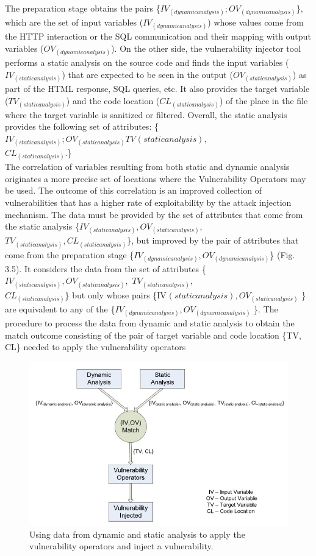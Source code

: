 \newline
The preparation stage obtains  the pairs \{$ IV_{(dynamic analysis)}; OV_{(dynamic analysis)} $\}, which are the set of
input variables ($ IV_{(dynamic analysis)} $) whose values come from
the HTTP interaction or the SQL communication and their
mapping with output variables ($ OV_{(dynamic analysis)} $). On the other side, the vulnerability injector tool performs a static analysis on the source code and finds the input variables ($ IV_{(static analysis)} $) that are expected to be seen in the
output ($ OV_{(static analysis)} $) as part of the HTML response,
SQL queries, etc. It also provides the target variable
($ TV_{(static analysis)} $) and the code location ($ CL_{(static analysis)} $)
of the place in the file where the target variable is sanitized
or filtered. Overall, the static analysis provides the following set of attributes: \{$ IV_{(static analysis)}; OV_{(static analysis)} TV_{}(static analysis),$ \\$ CL_{(static analysis)}. $\}
\\
\newline
The correlation of variables resulting from both static
and dynamic analysis originates a more precise set of locations where the Vulnerability Operators may be used. The
outcome of this correlation is an improved collection of
vulnerabilities that has a higher rate of exploitability by
the attack injection mechanism. The data must be provided
by the set of attributes that come from the static analysis
\{$ IV_{(static analysis)}, OV_{(static analysis)},$ \\ $ TV_{(static analysis)},
	CL_{(static analysis)} $\}, but improved by the pair of attributes
that come from the preparation stage \{$ IV_{(dynamic analysis)},
	OV_{(dynamic analysis)} $\} (Fig. 3.5). It considers the data from
the set of attributes \{$ IV_{(static analysis)}, OV_{(static analysis)},$
$TV_{(static analysis)}, $ \\ $CL_{(static analysis)} $\} but only whose pairs
\{IV$ _{}(static analysis), OV_{(static analysis)} $ \} are equivalent to any of
the \{$ IV_{(dynamic analysis)}, OV_{(dynamic analysis)} $ \}. The procedure to
process the data from dynamic and static analysis to obtain
the match outcome consisting of the pair of target variable
and code location \{TV, CL\} needed to apply the vulnerability operators
\begin{figure}
\centering
\includegraphics[width=0.7\linewidth]{Main/Fig5}
\caption{Using data from dynamic and static analysis to apply the vulnerability operators and inject a vulnerability.}
\label{fig:Fig5}
\end{figure}


